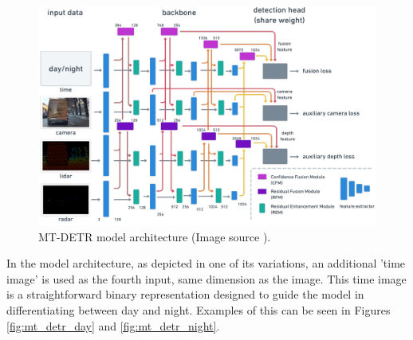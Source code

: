 \documentclass[report.tex]{subfiles}
\begin{document}
    \begin{figure}[h]
        \centering
        \includegraphics[width=1.0\textwidth]{images/methods/mtdetr/mtdetr_architecture.png}
        \caption{MT-DETR model architecture (Image source \cite{chu2023mt}).}
        \label{fig:mt_detr_architecture}
    \end{figure}


    In the model architecture, as depicted in one of its variations, an additional 'time image' is used as the fourth input, same dimension as the image. This time image is a straightforward binary representation designed to guide the model in differentiating between day and night. Examples of this can be seen in Figures \ref{fig:mt_detr_day} and \ref{fig:mt_detr_night}.
\end{document}
